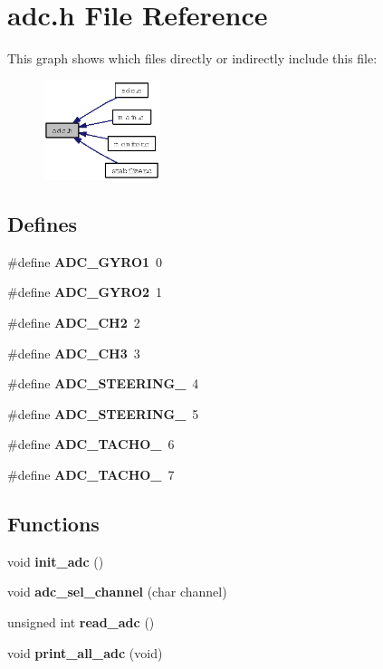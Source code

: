 \section{adc.h File Reference}
\label{adc_8h}


This graph shows which files directly or indirectly include this file:\begin{figure}[H]
\begin{center}
\leavevmode
\includegraphics[width=97pt]{adc_8h__dep__incl}
\end{center}
\end{figure}
\subsection*{Defines}
\begin{CompactItemize}
\item 
\#define {\bf ADC\_\-GYRO1}~0
\item 
\#define {\bf ADC\_\-GYRO2}~1
\item 
\#define {\bf ADC\_\-CH2}~2
\item 
\#define {\bf ADC\_\-CH3}~3
\item 
\#define {\bf ADC\_\-STEERING\_}~4
\item 
\#define {\bf ADC\_\-STEERING\_}~5
\item 
\#define {\bf ADC\_\-TACHO\_}~6
\item 
\#define {\bf ADC\_\-TACHO\_}~7
\end{CompactItemize}
\subsection*{Functions}
\begin{CompactItemize}
\item 
void {\bf init\_\-adc} ()
\item 
void {\bf adc\_\-sel\_\-channel} (char channel)
\item 
unsigned int {\bf read\_\-adc} ()
\item 
void {\bf print\_\-all\_\-adc} (void)
\end{CompactItemize}
